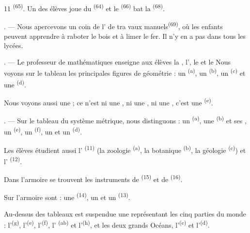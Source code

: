 \begin{VUpage}[13]{11}
\VUcontinue
{}\textsuperscript{(65)}. Un des élèves joue du  \textsuperscript{(64)} et le\nl
{}\textsuperscript{(66)} bat la \textsuperscript{(68)}.

. --- Nous apercevons un coin de l' de tra\cc
vaux manuels\textsuperscript{(69)}, où les enfants peuvent apprendre à\nl
raboter le bois et à limer le fer. Il n'y en a pas dans\nl
tous les lycées.

. --- Le professeur de mathématiques enseigne\nl
aux élèves la , l', le\nl
{} et le  Nous voyons\nl
sur le tableau les principales figures de géométrie :\nl
un  \textsuperscript{(a)}, un \textsuperscript{(b)}, un \textsuperscript{(c)} et une\nl
{} \textsuperscript{(d)}.

Nous voyons aussi une ; ce n'est ni une\nl
{}, ni une , ni une \cc
{}, c'est une  \textsuperscript{(e)}.

. --- Sur le tableau du système métrique, nous\nl
distinguons : un  \textsuperscript{(a)}, une  \textsuperscript{(b)} et ses\nl
{}, un  \textsuperscript{(e)}, un \textsuperscript{(f)}, un \nl
et un \textsuperscript{(d)}.

\VUblancAlinea
Les élèves étudient aussi l' \textsuperscript{(11)}\nl
(la zoologie \textsuperscript{(a)}, la botanique \textsuperscript{(b)}, la géologie \textsuperscript{(c)}) et l'\cc
{} \textsuperscript{(12)}.

\VUblancAlinea
Dans l'armoire se trouvent les instruments de \cc
{} \textsuperscript{(15)} et de  \textsuperscript{(16)}.

\VUblancAlinea
Sur l'armoire sont : une \textsuperscript{(14)}, un  et un\nl
{}\textsuperscript{(13)}.

\VUblancAlinea
Au-dessus des tableaux est suspendue une \nl
{} représentant les cinq parties du\nl
monde : l'\textsuperscript{(g)}, l'\textsuperscript{(e)}, l'\textsuperscript{(f)}, l'\cc
{}\textsuperscript{(ab)} et l'\textsuperscript{(h)}, et les deux grands Océans,\nl
l'\textsuperscript{(c)} et l'\textsuperscript{(d)}.

\VUsaut{6.0mm}
\VUfilet{22mm}
\end{VUpage}

